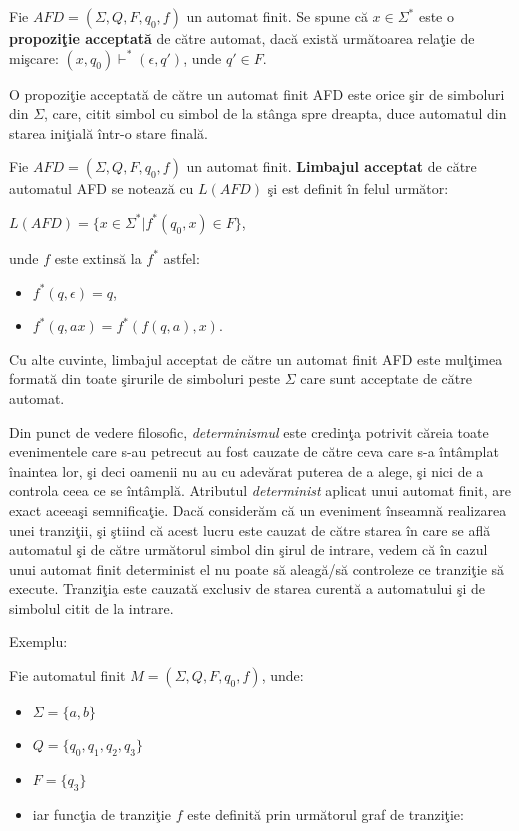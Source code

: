 \begin{definitie}
Fie $AFD=(\Sigma, Q, F, q_{0}, f)$ un automat finit. Se spune că $x \in \Sigma^{*}$ este o \textbf{propoziţie acceptată} de către automat, dacă există următoarea relaţie de mişcare: $(x, q_{0}) \vdash^* (\epsilon, q')$, unde $q' \in F$.
\end{definitie}

O propoziţie acceptată de către un automat finit AFD este orice şir de simboluri din $\Sigma$, care, citit simbol cu simbol de la stânga spre dreapta, duce automatul din starea iniţială într-o stare finală.

\begin{definitie}
Fie $AFD=(\Sigma, Q, F, q_{0}, f)$ un automat finit. \textbf{Limbajul acceptat} de către automatul AFD se notează cu $L(AFD)$ şi est definit în felul următor:

$L(AFD) = \{ x \in \Sigma^{*} | f^{*}(q_{0}, x) \in F \}$,

unde $f$ este extinsă la $f^{*}$ astfel:
\begin{itemize}
\item
$f^{*}(q, \epsilon) = q$,
\item
$f^{*}(q, ax) = f^{*}(f(q, a), x)$.
\end{itemize}
\end{definitie}

Cu alte cuvinte, limbajul acceptat de către un automat finit AFD este mulţimea formată din toate şirurile de simboluri peste $\Sigma$ care sunt acceptate de către automat. 

Din punct de vedere filosofic, \textit{determinismul} este credinţa potrivit căreia toate evenimentele care s-au petrecut au fost cauzate de către ceva care s-a întâmplat înaintea lor, şi deci oamenii nu au cu adevărat puterea de a alege, şi nici de a controla ceea ce se întâmplă. Atributul \textit{determinist} aplicat unui automat finit, are exact aceeaşi semnificaţie. Dacă considerăm că un eveniment înseamnă realizarea unei tranziţii, şi ştiind că acest lucru este cauzat de către starea în care se află automatul şi de către următorul simbol din şirul de intrare, vedem că în cazul unui automat finit determinist el nu poate să aleagă/să controleze ce tranziţie să execute. Tranziţia este cauzată exclusiv de starea curentă a automatului şi de simbolul citit de la intrare.

Exemplu:

Fie automatul finit $M=(\Sigma, Q, F, q_{0}, f)$, unde:
\begin{itemize}
\item
$\Sigma=\{ a, b \}$
\item
$Q=\{ q_{0}, q_{1}, q_{2}, q_{3} \}$
\item
$F=\{ q_{3} \}$
\item
iar funcţia de tranziţie $f$ este definită prin următorul graf de tranziţie:
\end{itemize}

